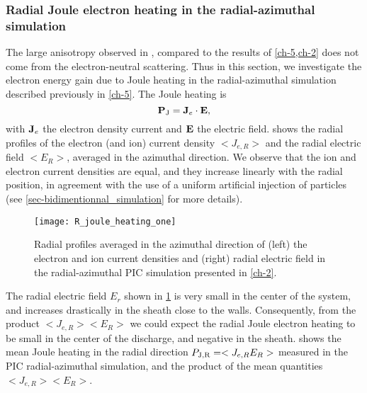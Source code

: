     \FloatBarrier

    \subsubsection{Radial Joule electron heating in the radial-azimuthal simulation } \label{subsec-radial-heating}
  
  The large anisotropy observed in , compared to the results of \cref{ch-5,ch-2} does not come from the electron-neutral scattering.
  Thus in this section, we investigate the electron energy gain due to Joule heating in the radial-azimuthal simulation described previously in \cref{ch-5}.
  The Joule heating is
  \begin{equation} \label{eq-epower}
      {\mathbf P_{\rm J}} = {\mathbf J_e} \cdot {\mathbf E},
  \end{equation}
  with ${\mathbf J_e}$ the electron density current and ${\mathbf E}$ the electric field.
   shows the radial profiles of the electron (and ion) current density $< J_{e, R}>$ and the radial electric field $ < E_R >$, averaged in the azimuthal direction.
  We observe that the ion and electron current densities are equal, and they increase linearly with the radial position, in agreement with the use of a uniform artificial injection of particles (see \cref{sec-bidimentionnal_simulation} for more details).

  \begin{figure}[hbt]
    \centering
    \texttt{[image: R\_joule\_heating\_one]}
    \caption{Radial profiles averaged in the azimuthal direction of (left) the electron and ion current densities and (right) radial electric field in the radial-azimuthal \acs{PIC} simulation presented in \cref{ch-2}. }
    \label{fig-epower_radialone}
  \end{figure}
  
  The radial electric field $E_r$ shown in \cref{fig-epower_radialone} is very small in the center of the system, and increases drastically in the sheath close to the walls.
  Consequently, from the product $< J_{e, R}>  < E_R >$ we could expect the radial Joule electron heating to be small in the center of the discharge, and negative in the sheath.
   shows the mean Joule heating in the radial direction ${P_{\rm J, R}} = < J_{e, R} E_R >$ measured in the \ac{PIC} radial-azimuthal simulation, and the product of the mean quantities $< J_{e, R}>  < E_R >$.

